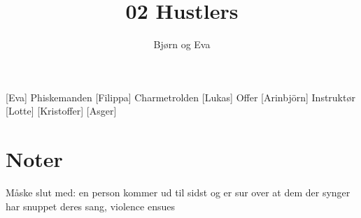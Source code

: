 \documentclass[a4paper,11pt]{article}
\title{02 Hustlers}
\author{Bjørn og Eva}
\begin{document}
\maketitle

\begin{roles}
[Eva] Phiskemanden
[Filippa] Charmetrolden
[Lukas] Offer
[Arinbjörn] Instruktør
[Lotte]
[Kristoffer]
[Asger]
\end{roles} 

\section*{Noter}
Måske slut med: en person kommer ud til sidst og er sur over at dem der synger har snuppet deres sang, violence ensues

\begin{props}
\prop{}
\prop{}
\prop{}
\prop{}
\prop{}
\prop{}
\end{props}
\end{document}
